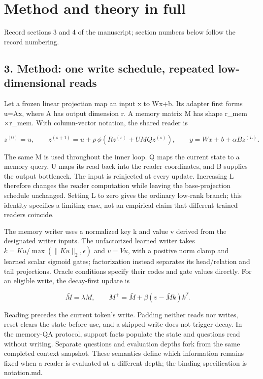\section{Method and theory in full}\label{app:D}
\noindent Record sections 3 and 4 of the manuscript; section numbers below follow the record numbering.
\subsection*{3. Method: one write schedule, repeated low-dimensional reads}

Let a frozen linear projection map an input x to Wx+b. Its adapter first forms u=Ax,
where A has output dimension r. A memory matrix M has shape r\_mem\ensuremath{\times}r\_mem. With column-vector
notation, the shared reader is

\[
z^{(0)}=u,\qquad
z^{(s+1)}=u+\rho\,\phi(Rz^{(s)}+UMQz^{(s)}),\qquad
y=Wx+b+\alpha Bz^{(L)}.
\]

The same M is used throughout the inner loop. Q maps the current state to a memory
query, U maps its read back into the reader coordinates, and B supplies the output
bottleneck. The input is reinjected at every update. Increasing L therefore changes
the reader computation while leaving the base-projection schedule unchanged. Setting
L to zero gives the ordinary low-rank branch; this identity specifies a limiting case,
not an empirical claim that different trained readers coincide.

The memory writer uses a normalized key k and value v derived from the designated
writer inputs. The unfactorized learned writer takes
\(k=Ku/\max(\|Ku\|_2,\epsilon)\) and \(v=Vu\), with a positive norm clamp and
learned scalar sigmoid gates; factorization instead separates its head/\allowbreak{}relation
and tail projections. Oracle conditions specify their codes and gate values
directly. For an eligible write, the decay-first update is

\[
\bar M=\lambda M,\qquad
M^+=\bar M+\beta(v-\bar Mk)k^T.
\]

Reading precedes the current token’s write. Padding neither reads nor writes, reset
clears the state before use, and a skipped write does not trigger decay. In the memory-QA
protocol, support facts populate the state and questions read without writing. Separate
questions and evaluation depths fork from the same completed context snapshot. These
semantics define which information remains fixed when a reader is evaluated at a
different depth; the binding specification is notation.md.

